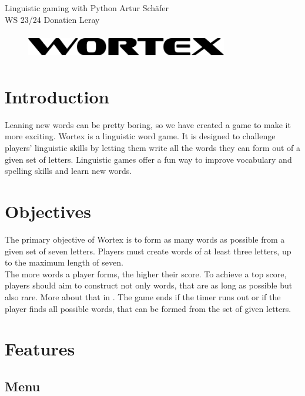 \documentclass{article}[12pt]
\newcommand{\studentOne}{Artur Schäfer} %
\newcommand{\studentTwo}{Donatien Leray} %
\begin{document}
\noindent
Linguistic gaming with Python \hfill \studentOne\\
WS 23/24 \hfill \studentTwo

\vspace{1cm}

\begin{figure}[ht]
    \centering
    \includegraphics[width=250pt,height=33pt]{pictures/logo_black.png}
\end{figure}

\vspace{0.5cm}

    \section*{Introduction}

    Leaning new words can be pretty boring, so we have created a game to make
    it more exciting. Wortex is a linguistic word game. It is designed to
    challenge players' linguistic skills by letting them write all the words
    they can form out of a given set of letters. Linguistic
    games offer a fun way to improve vocabulary and spelling skills and learn new words.

    \section*{Objectives}

    The primary objective of Wortex is to form as many words as possible from a
    given set of seven letters. Players must create words of at least three
    letters, up  to the maximum length of seven. \\ The more words a player
    forms, the higher their score. To achieve a top score, players should aim
    to construct not only words, that are as long as possible but also rare. More about that in .
    The game ends if the timer runs out or if the player finds all possible
    words, that can be formed from the set of given letters.

    \section*{Features}

    \subsection*{Menu}
\end{document}
